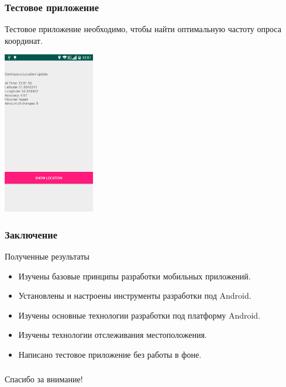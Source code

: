 \documentclass[hyperref={unicode}]{beamer}
\begin{document}
\begin{frame}
  \frametitle{Тестовое приложение}
	Тестовое приложение необходимо, чтобы найти оптимальную частоту
	опроса координат.\\
	\begin{center}
		\includegraphics[width=0.3\textwidth, height=0.5\textheight]{images/Screenshot_2018-12-07-12-01-59.png}
	\end{center}
  
\end{frame}

\begin{frame}
  \frametitle{Заключение}
  
  Полученные результаты
  
  \begin{itemize}
  	\item Изучены базовые принципы разработки мобильных приложений.
  	\item Установлены и настроены инструменты разработки под Android.
  	\item Изучены основные технологии разработки под платформу Android.
  	\item Изучены технологии отслеживания местоположения.
  	\item Написано тестовое приложение без работы в фоне.
  \end{itemize}
  
\end{frame}

\begin{frame}
  \frametitle{}
  
{\Large\mbox{}\hfil Спасибо за внимание!}
  
\end{frame}
\end{document}
